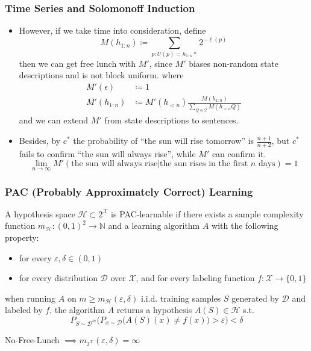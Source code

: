 \documentclass[UTF8,11pt,colorlinks,compress,openany]{beamer}%
\begin{document}
\begin{frame}\frametitle{Time Series and Solomonoff Induction}
	\begin{itemize}
		\item However, if we take time into consideration, define
		\[M(h_{1:n})\coloneqq \sum\limits_{p:U(p)=h_{1:n}*}2^{-\ell(p)}\]
		then we can get free lunch with $M'$, since $M'$ biases non-random state descriptions and is not block uniform.
		where 
		\begin{align*}
		M'(\epsilon)&\coloneqq 1\\
		M'(h_{1:n})&\coloneqq M'(h_{<n})\frac{M(h_{1:n})}{\sum\limits_{Q\in\mathcal{Q}}M(h_{<n}Q)}
		\end{align*}
		and we can extend $M'$ from state descriptions to sentences.
		\item Besides, by $c^*$ the probability of ``the sun will rise tomorrow'' is $\frac{n+1}{n+2}$, but $c^*$ fails to confirm ``the sun will always rise'', while $M'$ can confirm it.
		\[\lim\limits_{n\to\infty}M'(\text{the sun will always rise}|\text{the sun rises in the first $n$ days})=1\]
	\end{itemize}
\end{frame}

\begin{frame}\frametitle{PAC (Probably Approximately Correct) Learning}
\setlength\abovedisplayskip{0pt}
\setlength\belowdisplayskip{0pt}
	\begin{definition}
		A hypothesis space $\mathcal{H}\subset 2^{\mathcal{X}}$ is PAC-learnable if there exists a sample complexity function $m_{\mathcal{H}}: (0,1)^2\to\mathbb{N}$ and a learning algorithm $A$ with the following property:
		\begin{itemize}
			\item for every $\varepsilon,\delta\in(0,1)$
			\item for every distribution $\mathcal{D}$ over $\mathcal{X}$, and for every labeling function $f:\mathcal{X}\to\{0,1\}$
		\end{itemize}
		when running $A$ on $m\geq m_{\mathcal{H}}(\varepsilon,\delta)$ i.i.d. training samples $S$ generated by $\mathcal{D}$ and labeled by $f$, the algorithm $A$ returns a hypothesis $A(S)\in\mathcal{H}$ s.t.
		\[P_{S\sim\mathcal{D}^m}\Big(P_{x\sim\mathcal{D}}\big(A(S)(x)\neq f(x)\big)>\varepsilon\Big)<\delta\]
	\end{definition}
	\centering No-Free-Lunch $\implies m_{2^{\mathcal{X}}}(\varepsilon,\delta)=\infty$
\end{frame}
\end{document}
